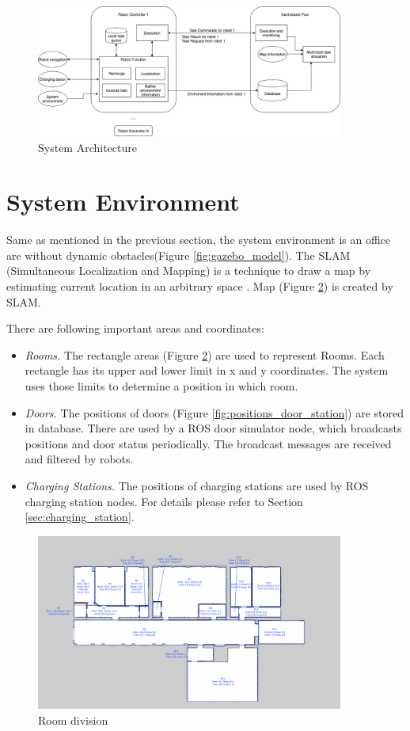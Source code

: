 \begin{figure}[htbp]
	\centering
	\includegraphics[width = 0.9\textwidth]{content/images/ch3/architecture.drawio.png}
	\caption{System Architecture}
	\label{fig:system_architecture}
\end{figure}

\section{System Environment}
Same as mentioned in the previous section, the system environment is an office are without dynamic obstacles(Figure \ref{fig:gazebo_model}). The SLAM (Simultaneous Localization and Mapping) is a technique to draw a map by estimating current location in an arbitrary space \cite{slam}. Map (Figure \ref{fig:room_division}) is created by SLAM.


There are following important areas and coordinates:
\begin{itemize}
	\item \textsl{Rooms.} The rectangle areas (Figure \ref{fig:room_division}) are used to represent Rooms. Each rectangle has its upper and lower limit in x and y coordinates. The system uses those limits to determine a position in which room. 
	\item \textsl{Doors.} The positions of doors (Figure \ref{fig:positions_door_station}) are stored in database. There are used by a ROS door simulator node, which broadcasts positions and door status periodically. The broadcast messages are received and filtered by robots.
	\item \textsl{Charging Stations.} The positions of charging stations are used by ROS charging station nodes. For details please refer to Section \ref{sec:charging_station}.
\end{itemize}

\begin{figure}[htbp]
	\centering
	\includegraphics[width = 0.9\textwidth]{content/images/ch3/room_division.png}
	\caption{Room division}
	\label{fig:room_division}
\end{figure}

